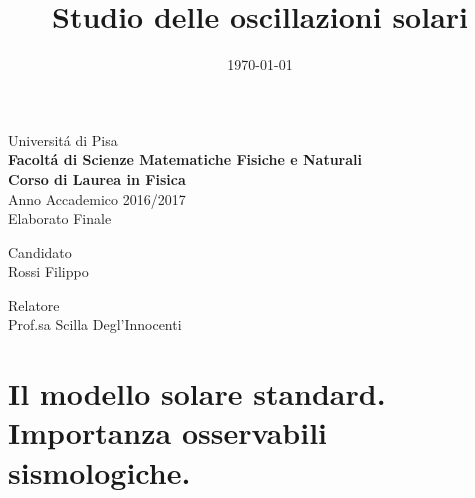\documentclass[twoside,11pt,fleqn]{memoir}%
\author{ }
\title{Studio delle oscillazioni solari}
\date{\today}
\makeatletter
\newcommand{\titolo}{\@title}
\makeatother
\begin{document}

\begingroup

\thispagestyle{empty}
\begin{center}
\Huge Universit\'a di Pisa\\ \vspace{1cm}\textbf{\huge Facolt\'a di Scienze Matematiche Fisiche e Naturali}\\ \vspace{2cm} \textbf{\LARGE Corso di Laurea in Fisica}\\\Large Anno Accademico 2016/2017\\ \vspace{5cm} \LARGE Elaborato Finale\\ \vspace{1cm} \Huge\titolo
\vspace{9cm}


{
\centering
\begin{minipage}[c]{0.5\textwidth}\centering\Large Candidato\\ \Large Rossi Filippo\end{minipage}\hfill \begin{minipage}[c]{0.5\textwidth}\centering\Large Relatore \\ \Large Prof.sa Scilla Degl'Innocenti\end{minipage}
}


\end{center}




\frontmatter

\endgroup

\cleartorecto


\tableofcontents*

%


\mainmatter


\part{Il modello solare standard. Importanza osservabili sismologiche.}


\end{document}
